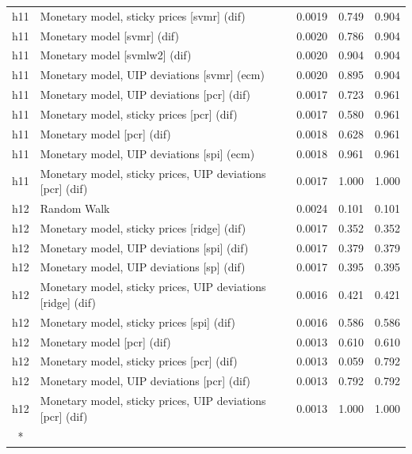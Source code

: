\begin{ThreePartTable}
\begin{longtable}[t]{cp{5.5cm}ccc}
h11 & \raggedright Monetary model, sticky prices [svmr] (dif) & 0.0019 & 0.749 & 0.904\\
h11 & \raggedright Monetary model [svmr] (dif) & 0.0020 & 0.786 & 0.904\\
h11 & \raggedright Monetary model [svmlw2] (dif) & 0.0020 & 0.904 & 0.904\\
h11 & \raggedright Monetary model, UIP deviations [svmr] (ecm) & 0.0020 & 0.895 & 0.904\\
h11 & \raggedright Monetary model, UIP deviations [pcr] (dif) & 0.0017 & 0.723 & 0.961\\
h11 & \raggedright Monetary model, sticky prices [pcr] (dif) & 0.0017 & 0.580 & 0.961\\
h11 & \raggedright Monetary model [pcr] (dif) & 0.0018 & 0.628 & 0.961\\
h11 & \raggedright Monetary model, UIP deviations [spi] (ecm) & 0.0018 & 0.961 & 0.961\\
h11 & \raggedright Monetary model, sticky prices, UIP deviations [pcr] (dif) & 0.0017 & 1.000 & 1.000\\
\addlinespace
h12 & \raggedright Random Walk & 0.0024 & 0.101 & 0.101\\
h12 & \raggedright Monetary model, sticky prices [ridge] (dif) & 0.0017 & 0.352 & 0.352\\
h12 & \raggedright Monetary model, UIP deviations [spi] (dif) & 0.0017 & 0.379 & 0.379\\
h12 & \raggedright Monetary model, UIP deviations [sp] (dif) & 0.0017 & 0.395 & 0.395\\
h12 & \raggedright Monetary model, sticky prices, UIP deviations [ridge] (dif) & 0.0016 & 0.421 & 0.421\\
h12 & \raggedright Monetary model, sticky prices [spi] (dif) & 0.0016 & 0.586 & 0.586\\
h12 & \raggedright Monetary model [pcr] (dif) & 0.0013 & 0.610 & 0.610\\
h12 & \raggedright Monetary model, sticky prices [pcr] (dif) & 0.0013 & 0.059 & 0.792\\
h12 & \raggedright Monetary model, UIP deviations [pcr] (dif) & 0.0013 & 0.792 & 0.792\\
h12 & \raggedright Monetary model, sticky prices, UIP deviations [pcr] (dif) & 0.0013 & 1.000 & 1.000\\*
\end{longtable}
\end{ThreePartTable}
\endgroup{}
